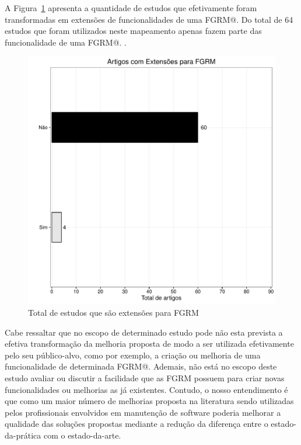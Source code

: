 A Figura~\ref{fig:grafico_virou_extensao} apresenta a quantidade de estudos que
efetivamente foram transformadas em extensões de funcionalidades de uma FGRM@.
Do total de 64 estudos que foram utilizados neste mapeamento apenas fazem parte
das funcionalidade de uma FGRM@. 
. 

\begin{figure}[htpb]
	\centering
	\includegraphics[width=0.8\linewidth]{chapter-mapeamento-sistematico/img/grafico_virou_extensao.pdf}
	\caption{Total de estudos que são extensões para FGRM}
\label{fig:grafico_virou_extensao}
\end{figure}

Cabe ressaltar que no escopo de determinado estudo pode não esta prevista a
efetiva transformação da melhoria proposta de modo a ser utilizada efetivamente
pelo seu público-alvo, como por exemplo, a criação ou melhoria de uma
funcionalidade de determinada FGRM@. Ademais, não está no escopo deste estudo
avaliar ou discutir a facilidade que as FGRM possuem para criar novas
funcionalidades ou melhorias as já existentes. Contudo, o nosso entendimento é
que como um maior número de melhorias proposta na literatura sendo utilizadas
pelos profissionais envolvidos em manutenção de software poderia melhorar a
qualidade das soluções propostas mediante a redução da diferença entre o
estado-da-prática com o estado-da-arte. 



